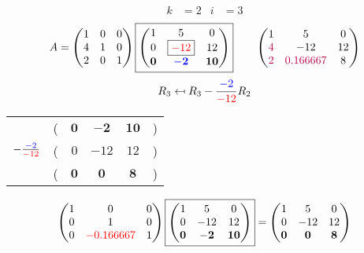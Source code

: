 \documentclass[pdf]{beamer}
\begin{document}
\begin{frame}{}\begin{align*} k &= 2 & i &= 3 \end{align*} $$A=\begin{pmatrix}1&0&0\\4&1&0\\2&0&1\end{pmatrix} \boxed{\begin{pmatrix}1&5&0\\0&\boxed{{\color{red}-12}}&12\\\mathbf{0}&\mathbf{{\color{blue}-2}}&\mathbf{10}\end{pmatrix}} \quad\quad \begin{pmatrix}1&5&0\\{\color{purple}4}&-12&12\\{\color{purple}2}&{\color{purple}0.166667}&8\end{pmatrix}$$ $$R_3 \mapsfrom R_3 - \frac{{\color{blue}-2}}{{\color{red}-12}} R_2$$ \begin{center}\begin{tabular}{cccccc}  &(& $ \mathbf{0} $ & $ \mathbf{-2} $ & $ \mathbf{10} $ &)\\$ -\frac{{\color{blue}-2}}{{\color{red}-12}} $&(& $ 0 $ & $ -12 $ & $ 12 $ &)\\\hline  &(& $ \mathbf{0} $ & $ \mathbf{0} $ & $ \mathbf{8} $ &) \end{tabular}\end{center} $$ \begin{pmatrix}1&0&0\\0&1&0\\0&{\color{red}-0.166667}&1\end{pmatrix} \boxed{\begin{pmatrix}1&5&0\\0&-12&12\\\mathbf{0}&\mathbf{-2}&\mathbf{10}\end{pmatrix}} = \begin{pmatrix}1&5&0\\0&-12&12\\\mathbf{0}&\mathbf{0}&\mathbf{8}\end{pmatrix} $$\end{frame}
\end{document}
